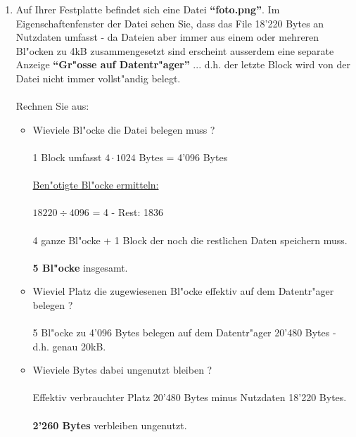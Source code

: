 \documentclass[a4paper,10pt]{article}
\begin{document}
\begin{enumerate}

\item Auf Ihrer Festplatte befindet sich eine Datei \textbf{``foto.png''}. Im Eigenschaftenfenster der Datei sehen Sie, dass das File 18'220 Bytes an Nutzdaten umfasst - da Dateien aber immer aus einem oder mehreren Bl"ocken zu 4kB zusammengesetzt sind erscheint ausserdem eine separate Anzeige \textbf{``Gr"osse auf Datentr"ager''} ... d.h. der letzte Block wird von der Datei nicht immer vollst"andig belegt. \\
\\
Rechnen Sie aus:
\begin{itemize}
\item Wieviele Bl"ocke die Datei belegen muss ? \\ \\
	 {\color{ForestGreen}
		 1 Block umfasst $4 \cdot 1024$ Bytes = 4'096 Bytes\\ \\
		 \underline{Ben"otigte Bl"ocke ermitteln:} \\ \\
		 $18220 \div 4096$ = 4 - Rest: 1836 \\ \\
		 4 ganze Bl"ocke + 1 Block der noch die restlichen Daten speichern muss. \\ \\
		 \textbf{5 Bl"ocke} insgesamt. \\
	 }
\item Wieviel Platz die zugewiesenen Bl"ocke effektiv auf dem Datentr"ager belegen ? \\ \\
	 {\color{ForestGreen}
		 5 Bl"ocke zu 4'096 Bytes belegen auf dem Datentr"ager 20'480 Bytes - d.h. genau 20kB.
	 }
\item Wieviele Bytes dabei ungenutzt bleiben ? \\ \\
	 {\color{ForestGreen}
		 Effektiv verbrauchter Platz 20'480 Bytes minus Nutzdaten 18'220 Bytes. \\ \\ 
		 \textbf{2'260 Bytes} verbleiben ungenutzt. \\
	 }
\end{itemize}


\end{enumerate}
\end{document}
